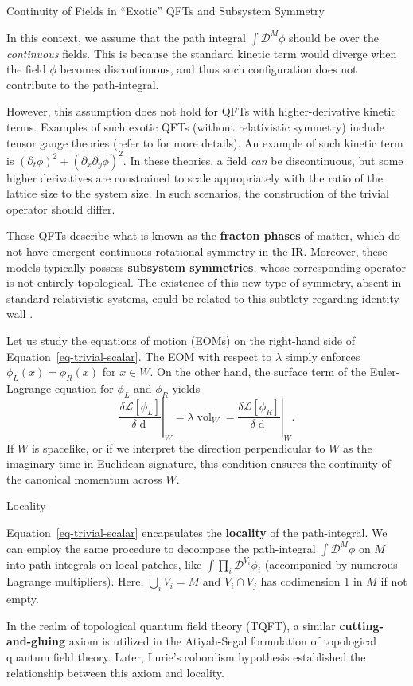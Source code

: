 \documentclass[11pt,toc=bibliography]{scrbook}
\DeclareMathOperator{\vol}{vol}
\numberwithin{equation}{section}
\DeclareMathOperator{\vol}{vol}
\begin{document}
\begin{tip}{Continuity of Fields in ``Exotic'' QFTs and Subsystem Symmetry}

In this context, we assume that the path integral
\(\int\mathcal{D}^M\phi\) should be over the \emph{continuous} fields.
This is because the standard kinetic term would diverge when the field
\(\phi\) becomes discontinuous, and thus such configuration does not
contribute to the path-integral.

However, this assumption does not hold for QFTs with higher-derivative
kinetic terms. Examples of such exotic QFTs (without relativistic
symmetry) include tensor gauge theories (refer to
\autocite{Pretko:2020cko,Seiberg:2020bhn} for more details). An example
of such kinetic term is
\((\partial_t\phi)^2 + (\partial_x\partial_y \phi)^2\). In these
theories, a field \emph{can} be discontinuous, but some higher
derivatives are constrained to scale appropriately with the ratio of the
lattice size to the system size. In such scenarios, the construction of
the trivial operator should differ.

These QFTs describe what is known as the \textbf{fracton phases} of
matter, which do not have emergent continuous rotational symmetry in the
IR. Moreover, these models typically possess \textbf{subsystem
symmetries}, whose corresponding operator is not entirely topological.
The existence of this new type of symmetry, absent in standard
relativistic systems, could be related to this subtlety regarding
identity wall .

\end{tip}

Let us study the equations of motion (EOMs) on the right-hand side of
Equation~\ref{eq-trivial-scalar}. The EOM with respect to \(\lambda\)
simply enforces \(\phi_L(x) = \phi_R(x)\) for \(x\in W\). On the other
hand, the surface term of the Euler-Lagrange equation for \(\phi_L\) and
\(\phi_R\) yields \[
    \left.\frac{\delta \mathcal{L}[\phi_L]}{\delta \mathop{d\phi_L}}\right|_W = \lambda \vol_W = \left. \frac{\delta \mathcal{L}[\phi_R]}{\delta \mathop{d \phi_R}}\right|_W.
\] If \(W\) is spacelike, or if we interpret the direction perpendicular
to \(W\) as the imaginary time in Euclidean signature, this condition
ensures the continuity of the canonical momentum across \(W\).

\begin{note}{Locality}

Equation~\ref{eq-trivial-scalar} encapsulates the \textbf{locality} of
the path-integral. We can employ the same procedure to decompose the
path-integral \(\int \mathcal{D}^M{\phi}\) on \(M\) into path-integrals
on local patches, like \(\int \prod_i\mathcal{D}^{V_i}\phi_i\)
(accompanied by numerous Lagrange multipliers). Here,
\(\bigcup_i V_i =M\) and \(V_i \cap V_j\) has codimension 1 in \(M\) if
not empty.

In the realm of topological quantum field theory (TQFT), a similar
\textbf{cutting-and-gluing} axiom is utilized in the Atiyah-Segal
formulation of topological quantum field theory. Later, Lurie's
cobordism hypothesis \autocite{Lurie} established the relationship
between this axiom and locality.

\end{note}
\end{document}
